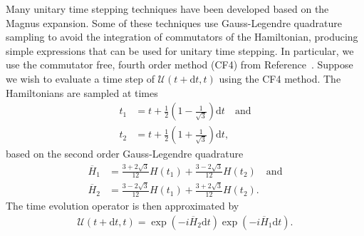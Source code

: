 \documentclass{jors}
\begin{document}
		Many unitary time stepping techniques have been developed based on the Magnus expansion\cite{auer_magnus_2018}.
		Some of these techniques use Gauss-Legendre quadrature sampling to avoid the integration of commutators of the Hamiltonian, producing simple expressions that can be used for unitary time stepping\cite{auer_magnus_2018}. %
		In particular, we use the commutator free, fourth order method (CF4) from Reference~\cite{auer_magnus_2018}.
		Suppose we wish to evaluate a time step of \(\mathcal{U}(t + \mathrm{d}t, t)\) using the CF4 method.
		The Hamiltonians are sampled at times
		\begin{align}
			t_1 &= t + \frac12 \left(1 - \frac{1}{\sqrt{3}}\right)\mathrm{d}t\quad\text{and}\\
			t_2 &= t + \frac12 \left(1 + \frac{1}{\sqrt{3}}\right)\mathrm{d}t,
		\end{align} %
		based on the second order Gauss-Legendre quadrature
		\begin{align}
			\overline{H}_1 &= \frac{3 + 2\sqrt{3}}{12}H(t_1) + \frac{3 - 2\sqrt{3}}{12}H(t_2)\quad\text{and}\label{eq:cf4_sample_1}\\
			\overline{H}_2 &= \frac{3 - 2\sqrt{3}}{12}H(t_1) + \frac{3 + 2\sqrt{3}}{12}H(t_2).\label{eq:cf4_sample_2}
		\end{align}
		The time evolution operator is then approximated by
		\begin{align}
			\mathcal{U}(t + \mathrm{d}t, t) = \exp(-i\overline{H}_2\mathrm{d}t)\exp(-i\overline{H}_1\mathrm{d}t).\label{eq:cf4_implementation}
		\end{align}%
\end{document}
